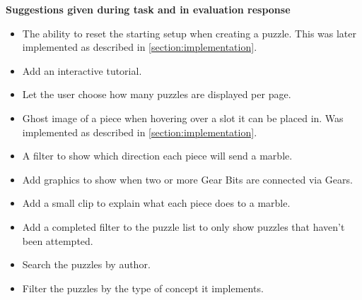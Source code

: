 \documentclass{l4proj}
\begin{document}
\textbf{Suggestions given during task and in evaluation response}
\label{suggestions}
\begin{itemize}
    \item The ability to reset the starting setup when creating a puzzle. This was later implemented as described in \ref{section:implementation}.
    \item Add an interactive tutorial.
    \item Let the user choose how many puzzles are displayed per page.
    \item Ghost image of a piece when hovering over a slot it can be placed in. Was implemented as described in \ref{section:implementation}.
    \item A filter to show which direction each piece will send a marble.
    \item Add graphics to show when two or more Gear Bits are connected via Gears.
    \item Add a small clip to explain what each piece does to a marble.
    \item Add a completed filter to the puzzle list to only show puzzles that haven't been attempted.
    \item Search the puzzles by author.
    \item Filter the puzzles by the type of concept it implements.
\end{itemize}
\end{document}
